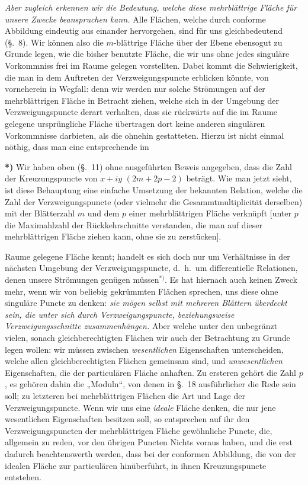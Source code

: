 \documentclass{article}
\begin{document}
\emph{Aber zugleich erkennen wir die Bedeutung, welche diese mehrblättrige Fläche für unsere Zwecke beanspruchen kann.} Alle Flächen, welche durch conforme Abbildung eindeutig aus einander hervorgehen, sind für uns gleichbedeutend (§.~8). Wir können also die $m$-blättrige Fläche über der Ebene ebensogut zu Grunde legen, wie die bisher benutzte Fläche, die wir uns ohne jedes singuläre Vorkommniss frei im Raume gelegen vorstellten. Dabei kommt die Schwierigkeit, die man in dem Auftreten der Verzweigungspuncte erblicken könnte, von vorneherein in Wegfall: denn wir werden nur solche Strömungen auf der mehrblättrigen Fläche in Betracht ziehen, welche sich in der Umgebung der Verzweigungspuncte derart verhalten, dass sie rückwärts auf die im Raume gelegene ursprüngliche Fläche übertragen dort keine anderen singulären Vorkommnisse darbieten, als die ohnehin gestatteten. Hierzu ist nicht einmal nöthig, dass man eine entsprechende im

\textbf{*)} Wir haben oben (§.~11) ohne ausgeführten Beweis angegeben, dass die Zahl der Kreuzungspuncte von $x + iy$ $(2m + 2p - 2)$ beträgt. Wie man jetzt sieht, ist diese Behauptung eine einfache Umsetzung der bekannten Relation, welche die Zahl der Verzweigungspuncte (oder vielmehr die Gesammtmultiplicität derselben) mit der Blätterzahl $m$ und dem $p$ einer mehrblättrigen Fläche verknüpft [unter $p$ die Maximahlzahl der Rückkehrschnitte verstanden, die man auf dieser mehrblättrigen Fläche ziehen kann, ohne sie zu zerstücken].

Raume gelegene Fläche kennt; handelt es sich doch nur um Verhältnisse in der nächsten Umgebung der Verzweigungspuncte, d.\ h.\ um differentielle Relationen, denen unsere Strömungen genügen müssen${}^{*)}$. Es hat hiernach auch keinen Zweck mehr, wenn wir von beliebig gekrümmten Flächen sprechen, uns diese ohne singuläre Puncte zu denken: \emph{sie mögen selbst mit mehreren Blättern überdeckt sein, die unter sich durch Verzweigungspuncte, beziehungsweise Verzweigungsschnitte zusammenhängen.} Aber welche unter den unbegränzt vielen, sonach gleichberechtigten Flächen wir auch der Betrachtung zu Grunde legen wollen: wir müssen zwischen \emph{wesentlichen} Eigenschaften unterscheiden, welche allen gleichberechtigten Flächen gemeinsam sind, und \emph{unwesentlichen} Eigenschaften, die der particulären Fläche anhaften. Zu ersteren gehört die Zahl $p$, es gehören dahin die „Moduln“, von denen in §.~18 ausführlicher die Rede sein soll; zu letzteren bei mehrblättrigen Flächen die Art und Lage der Verzweigungspuncte. Wenn wir uns eine \emph{ideale} Fläche denken, die nur jene wesentlichen Eigenschaften besitzen soll, so entsprechen auf ihr den Verzweigungspuncten der mehrblättrigen Fläche gewöhnliche Puncte, die, allgemein zu reden, vor den übrigen Puncten Nichts voraus haben, und die erst dadurch beachtenswerth werden, dass bei der conformen Abbildung, die von der idealen Fläche zur particulären hinüberführt, in ihnen Kreuzungspuncte entstehen.
\end{document}
